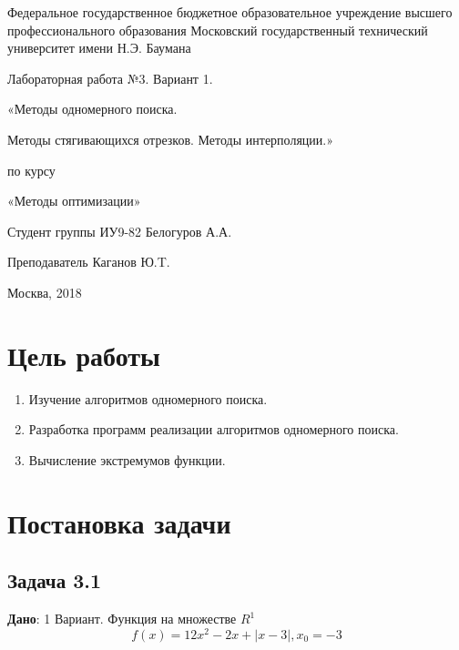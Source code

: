 \documentclass[a4paper, 12pt]{article}   	%
\begin{document}
\begin{titlepage}

\thispagestyle{empty}

\begin{center}
Федеральное государственное бюджетное образовательное учреждение высшего профессионального образования Московский государственный технический университет имени Н.Э. Баумана
\end{center}


\vfill

\centerline{\large{Лабораторная работа №3. Вариант 1.}}

\centerline{\large{«Методы одномерного поиска.}} 
\centerline{\large{Методы стягивающихся отрезков. Методы интерполяции.»}}

\centerline{\large{по курсу}}
\centerline{\large{«Методы оптимизации»}}


\vfill

Студент группы ИУ9-82 \hfill Белогуров А.А.

Преподаватель \hfill Каганов Ю.T. 
\vfill

\centerline{Москва, 2018}
\clearpage
\end{titlepage}

\newpage
\setcounter{page}{2}

\tableofcontents

\newpage

\section{Цель работы}

\begin{enumerate}
    \item Изучение алгоритмов одномерного поиска.
    \item Разработка программ реализации алгоритмов одномерного поиска.
    \item Вычисление экстремумов функции. 
\end{enumerate}

\newpage

\section{Постановка задачи}

\subsection{Задача 3.1}
    \textbf {Дано}: 1 Вариант. Функция на множестве $R^1$
    \begin{equation}
        f(x) = 12x^2-2x+ |x-3|, x_0 = -3
    \end{equation}
    
\end{document}
